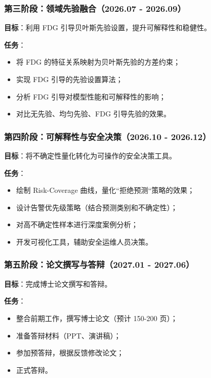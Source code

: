 \subsubsection{第三阶段：领域先验融合（2026.07 - 2026.09）}

\textbf{目标}：利用 FDG 引导贝叶斯先验设置，提升可解释性和稳健性。

\textbf{任务}：
\begin{itemize}
  \item 将 FDG 的特征关系映射为贝叶斯先验的方差约束；
  \item 实现 FDG 引导的先验设置算法；
  \item 分析 FDG 引导对模型性能和可解释性的影响；
  \item 对比无先验、均匀先验、FDG 引导先验的效果。
\end{itemize}


\subsubsection{第四阶段：可解释性与安全决策（2026.10 - 2026.12）}

\textbf{目标}：将不确定性量化转化为可操作的安全决策工具。

\textbf{任务}：
\begin{itemize}
  \item 绘制 Risk-Coverage 曲线，量化``拒绝预测``策略的效果；
  \item 设计告警优先级策略（结合预测类别和不确定性）；
  \item 对高不确定性样本进行深度案例分析；
  \item 开发可视化工具，辅助安全运维人员决策。
\end{itemize}

\subsubsection{第五阶段：论文撰写与答辩（2027.01 - 2027.06）}

\textbf{目标}：完成博士论文撰写和答辩。

\textbf{任务}：
\begin{itemize}
  \item 整合前期工作，撰写博士论文（预计 150-200 页）；
  \item 准备答辩材料（PPT、演讲稿）；
  \item 参加预答辩，根据反馈修改论文；
  \item 正式答辩。
\end{itemize}



